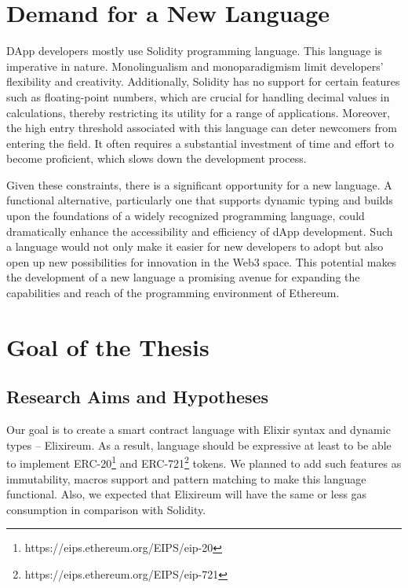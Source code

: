 \section{Demand for a New Language}
\label{sec:langdemand}

DApp developers mostly use Solidity programming language. This language is imperative in nature. Monolingualism and monoparadigmism limit developers' flexibility and creativity. Additionally, Solidity has no support for certain features such as floating-point numbers, which are crucial for handling decimal values in calculations, thereby restricting its utility for a range of applications. Moreover, the high entry threshold associated with this language can deter newcomers from entering the field. It often requires a substantial investment of time and effort to become proficient, which slows down the development process.

Given these constraints, there is a significant opportunity for a new language. A functional alternative, particularly one that supports dynamic typing and builds upon the foundations of a widely recognized programming language, could dramatically enhance the accessibility and efficiency of dApp development. Such a language would not only make it easier for new developers to adopt but also open up new possibilities for innovation in the Web3 space. This potential makes the development of a new language a promising avenue for expanding the capabilities and reach of the programming environment of Ethereum.

\section{Goal of the Thesis}
\label{sec:goal}

\subsection{Research Aims and Hypotheses}
Our goal is to create a smart contract language with Elixir syntax and dynamic types -- Elixireum. As a result, language should be expressive at least to be able to implement ERC-20\footnote{https://eips.ethereum.org/EIPS/eip-20} and ERC-721\footnote{https://eips.ethereum.org/EIPS/eip-721} tokens. We planned to add such features as immutability, macros support and pattern matching to make this language functional. Also, we expected that Elixireum will have the same or less gas consumption in comparison with Solidity.

